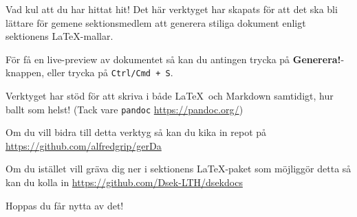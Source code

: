 \documentclass{dsekdoc}
\begin{document}
\setdate{}
\setmeeting{}

\maketitle

Vad kul att du har hittat hit!
Det här verktyget har skapats för att det ska bli lättare för gemene sektionsmedlem
att generera stiliga dokument enligt sektionens \LaTeX-mallar.

För få en live-preview av dokumentet så kan du antingen trycka på \textbf{Generera!}-knappen, eller trycka på \texttt{Ctrl/Cmd + S}.

Verktyget har stöd för att skriva i både \LaTeX~och Markdown samtidigt, hur ballt som helst!
\newline(Tack vare \texttt{pandoc} \url{https://pandoc.org/})

Om du vill bidra till detta verktyg så kan du kika in repot på \url{
    https://github.com/alfredgrip/gerDa
}

Om du istället vill gräva dig ner i sektionens \LaTeX-paket som möjliggör detta så kan du kolla in \url{
    https://github.com/Dsek-LTH/dsekdocs
}

Hoppas du får nytta av det!
\end{document}

